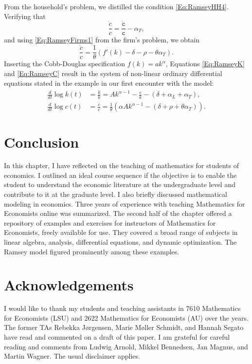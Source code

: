 \documentclass[10pt]{article}
\begin{document}
From the household's problem, we distilled the condition \eqref{Eq:RamseyHH4}. Verifying that
\[
\frac{\dot{c}}{c} = \frac{\dot{\mathtt{c}}}{\mathtt{c}} - \alpha_T,
\]
and using \eqref{Eq:RamseyFirms1} from the firm's problem, we obtain
\begin{equation}\label{Eq:RamseyC}
\frac{\dot{c}}{c} = \frac{1}{\theta} (f'(k) - \delta - \rho - \theta\alpha_T).
\end{equation}
Inserting the Cobb-Douglas specification $f(k) = ak^\alpha$, Equations \eqref{Eq:RamseyK} and \eqref{Eq:RamseyC} result in the system of non-linear ordinary differential equations stated in the example in our first encounter with the model:
\begin{align*}
\frac{d}{dt} \log k(t) &= \frac{\dot{k}}{k} = A k^{\alpha-1} - \frac{c}{k} - (\delta + \alpha_L + \alpha_T),\\
\frac{d}{dt} \log c(t) &= \frac{\dot{c}}{c} =\frac{1}{\theta} \left( \alpha A k^{\alpha-1} - (\delta + \rho + \theta \alpha_T) \right).
\end{align*}

\section{Conclusion}

In this chapter, I have reflected on the teaching of mathematics for students of economics. I outlined an ideal course sequence if the objective is to enable the student to understand the economic literature at the undergraduate level and contribute to it at the graduate level. I also briefly discussed mathematical modeling in economics. Three years of experience with teaching Mathematics for Economists online was summarized. The second half of the chapter offered a repository of examples and exercises for instructors of Mathematics for Economists, freely available for use. They covered a broad range of subjects in linear algebra, analysis, differential equations, and dynamic optimization. The Ramsey model figured prominently among these examples. 


%
\section*{Acknowledgements}
I would like to thank my students and teaching assistants in 7610 Mathematics for Economists (LSU) and 2622 Mathematics for Economists (AU) over the years. The former TAs Rebekka Jørgensen, Marie Møller Schmidt, and Hannah Segato have read and commented on a draft of this paper. I am grateful for careful reading and comments from Ludwig Arnold, Mikkel Bennedsen, Jan Magnus, and Martin Wagner. The usual disclaimer applies.




\clearpage 

{\small 


}
\end{document}
